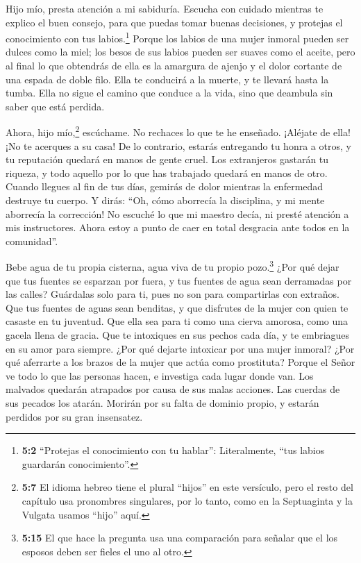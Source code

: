  Hijo mío, presta atención a mi sabiduría. Escucha con
cuidado mientras te explico el buen consejo,  para que
puedas tomar buenas decisiones, y protejas el conocimiento con tus
labios.\footnote{\textbf{5:2} ``Protejas el conocimiento con tu
  hablar'': Literalmente, ``tus labios guardarán conocimiento''.}
 Porque los labios de una mujer inmoral pueden ser dulces
como la miel; los besos de sus labios pueden ser suaves como el aceite,
 pero al final lo que obtendrás de ella es la amargura de
ajenjo y el dolor cortante de una espada de doble filo. 
Ella te conducirá a la muerte, y te llevará hasta la tumba.
 Ella no sigue el camino que conduce a la vida, sino que
deambula sin saber que está perdida.

 Ahora, hijo mío,\footnote{\textbf{5:7} El idioma hebreo
  tiene el plural ``hijos'' en este versículo, pero el resto del
  capítulo usa pronombres singulares, por lo tanto, como en la
  Septuaginta y la Vulgata usamos ``hijo'' aquí.} escúchame. No rechaces
lo que te he enseñado.  ¡Aléjate de ella! ¡No te acerques
a su casa!  De lo contrario, estarás entregando tu honra a
otros, y tu reputación quedará en manos de gente cruel. 
Los extranjeros gastarán tu riqueza, y todo aquello por lo que has
trabajado quedará en manos de otro.  Cuando llegues al
fin de tus días, gemirás de dolor mientras la enfermedad destruye tu
cuerpo.  Y dirás: ``Oh, cómo aborrecía la disciplina, y
mi mente aborrecía la corrección!  No escuché lo que mi
maestro decía, ni presté atención a mis instructores. 
Ahora estoy a punto de caer en total desgracia ante todos en la
comunidad''.

 Bebe agua de tu propia cisterna, agua viva de tu propio
pozo.\footnote{\textbf{5:15} El que hace la pregunta usa una comparación
  para señalar que el los esposos deben ser fieles el uno al otro.}
 ¿Por qué dejar que tus fuentes se esparzan por fuera, y
tus fuentes de agua sean derramadas por las calles? 
Guárdalas solo para ti, pues no son para compartirlas con extraños.
 Que tus fuentes de aguas sean benditas, y que disfrutes
de la mujer con quien te casaste en tu juventud.  Que
ella sea para ti como una cierva amorosa, como una gacela llena de
gracia. Que te intoxiques en sus pechos cada día, y te embriagues en su
amor para siempre.  ¿Por qué dejarte intoxicar por una
mujer inmoral? ¿Por qué aferrarte a los brazos de la mujer que actúa
como prostituta?  Porque el Señor ve todo lo que las
personas hacen, e investiga cada lugar donde van.  Los
malvados quedarán atrapados por causa de sus malas acciones. Las cuerdas
de sus pecados los atarán.  Morirán por su falta de
dominio propio, y estarán perdidos por su gran insensatez.

